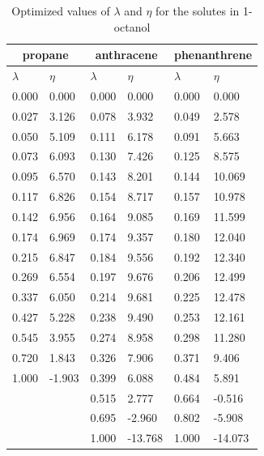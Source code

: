 \documentclass[
	12pt,				%
	openany,			%
	oneside,			%
	a4paper,			%
	english,			%
	brazil				%
	]{abntex2}
\begin{document}
\begin{apendicesenv}
\begin{table}[h]
	\centering
	\caption{Optimized values of $\lambda$ and $\eta$ for the solutes in 1-octanol}
	\begin{tabular}{llllll}
		\hline
		\multicolumn{2}{c}{propane}& \multicolumn{2}{c}{anthracene}& \multicolumn{2}{c}{phenanthrene}\\
		\hline
		$\lambda$ & $\eta$ & $\lambda$ & $\eta$  & $\lambda$ & $\eta$   \\ 
		\hline
0.000	&	0.000	&	0.000	&	0.000	&	0.000	&	0.000	\\
0.027	&	3.126	&	0.078	&	3.932	&	0.049	&	2.578	\\
0.050	&	5.109	&	0.111	&	6.178	&	0.091	&	5.663	\\
0.073	&	6.093	&	0.130	&	7.426	&	0.125	&	8.575	\\
0.095	&	6.570	&	0.143	&	8.201	&	0.144	&	10.069	\\
0.117	&	6.826	&	0.154	&	8.717	&	0.157	&	10.978	\\
0.142	&	6.956	&	0.164	&	9.085	&	0.169	&	11.599	\\
0.174	&	6.969	&	0.174	&	9.357	&	0.180	&	12.040	\\
0.215	&	6.847	&	0.184	&	9.556	&	0.192	&	12.340	\\
0.269	&	6.554	&	0.197	&	9.676	&	0.206	&	12.499	\\
0.337	&	6.050	&	0.214	&	9.681	&	0.225	&	12.478	\\
0.427	&	5.228	&	0.238	&	9.490	&	0.253	&	12.161	\\
0.545	&	3.955	&	0.274	&	8.958	&	0.298	&	11.280	\\
0.720	&	1.843	&	0.326	&	7.906	&	0.371	&	9.406	\\
1.000	&	-1.903	&	0.399	&	6.088	&	0.484	&	5.891	\\
&		&	0.515	&	2.777	&	0.664	&	-0.516	\\
&		&	0.695	&	-2.960	&	0.802	&	-5.908	\\
&		&	1.000	&	-13.768	&	1.000	&	-14.073	\\

		
		\hline
	\end{tabular}
\end{table}


\end{apendicesenv}
\end{document}
